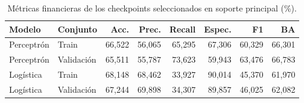 \begin{table}[htbp]
\centering\small
\caption{Métricas financieras de los checkpoints seleccionados en soporte principal (\%).}\label{tab:tf-desarrollo}
\begin{tabular}{llrrrrrr}\toprule
Modelo & Conjunto & Acc. & Prec. & Recall & Espec. & F1 & BA \\ \midrule
Perceptrón & Train & 66,522 & 56,065 & 65,295 & 67,306 & 60,329 & 66,301 \\
Perceptrón & Validación & 65,511 & 55,787 & 73,623 & 59,943 & 63,476 & 66,783 \\
Logística & Train & 68,148 & 68,462 & 33,927 & 90,014 & 45,370 & 61,970 \\
Logística & Validación & 67,244 & 69,898 & 34,307 & 89,857 & 46,025 & 62,082 \\
\bottomrule\end{tabular}
\end{table}
